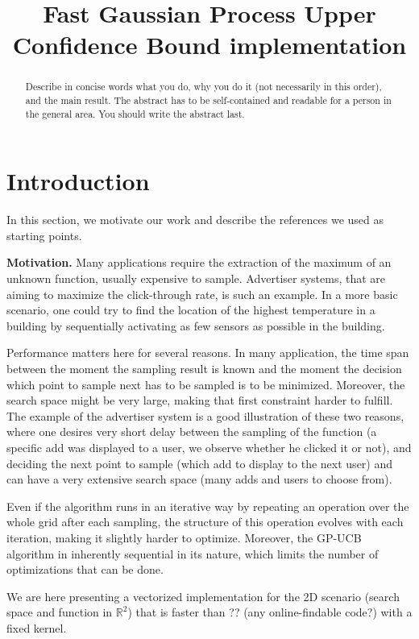 \documentclass[letterpaper]{article}
\title{Fast Gaussian Process Upper Confidence Bound implementation}
\newcommand{\mypar}[1]{{\bf #1.}}
\begin{document}
%
\maketitle
%

\begin{abstract}
Describe in concise words what you do, why you do it (not necessarily
in this order), and the main result.  The abstract has to be
self-contained and readable for a person in the general area. You
should write the abstract last.
\end{abstract}

\section{Introduction}\label{sec:intro}

In this section, we motivate our work and describe the references we used as starting points.

\mypar{Motivation} Many applications require the extraction of the maximum of an unknown function, usually expensive to sample. Advertiser systems, that are aiming to maximize the click-through rate, is such an example. In a more basic scenario, one could try to find the location of the highest temperature in a building by sequentially activating as few sensors as possible in the building.

Performance matters here for several reasons. In many application, the time span between the moment the sampling result is known and the moment the decision which point to sample next has to be sampled is to be minimized. Moreover, the search space might be very large, making that first constraint harder to fulfill. The example of the advertiser system is a good illustration of these two reasons, where one desires very short delay between the sampling of the function (a specific add was displayed to a user, we observe whether he clicked it or not), and deciding the next point to sample (which add to display to the next user) and can have a very extensive search space (many adds and users to choose from).

Even if the algorithm runs in an iterative way by repeating an operation over the whole grid after each sampling, the structure of this operation evolves with each iteration, making it slightly harder to optimize. Moreover, the GP-UCB algorithm in inherently sequential in its nature, which limits the number of optimizations that can be done.

We are here presenting a vectorized implementation for the 2D scenario (search space and function in $\mathbb{R}^2$) that is faster than ?? (any online-findable code?) with a fixed kernel.
\end{document}
